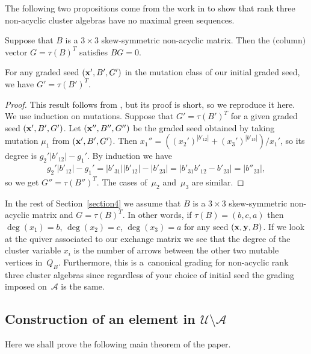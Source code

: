 The following two propositions come from the work in \cite{S1} to show that rank three non-acyclic cluster algebras have no maximal green sequences.
\begin{Theorem}
Suppose that $B$ is a $3\times 3$ skew-symmetric non-acyclic matrix. Then the $($column$)$ vector $G=\tau(B)^T$ satisfies $BG=0.$
\end{Theorem}

\begin{Lemma}\label{lemma: grading}
For any graded seed $({\bf x}',B',G')$ in the mutation class of our initial graded seed, we have $G'= \tau(B')^T$.
\end{Lemma}

\begin{proof}
This result follows from \cite[Lemma~2.3]{S1}, but its proof is short, so we reproduce it here. We use induction on mutations. Suppose that $G'= \tau(B')^T$ for a given graded seed $({\bf x}',B',G')$. Let $({\bf x}'',B'',G'')$ be the graded seed obtained by taking mutation $\mu_1$ from $({\bf x}',B',G')$.  Then $x_1''=((x_2')^{|b'_{12}|}+(x_3')^{|b'_{13}|})/x_1'$, so its degree is $g_2' |b'_{12}|-g_1'$. By induction we have
\begin{gather*}
g_2' |b'_{12}|-g_1' =|b'_{31}| |b'_{12}|-|b'_{23}| = |b'_{31}b'_{12}-b'_{23}| =|b''_{23}|,
\end{gather*}
so we get $G''= \tau(B'')^T$. The cases of~$\mu_2$ and~$\mu_3$ are similar.
\end{proof}


In the rest of Section~\ref{section4} we assume that $B$ is a $3\times 3$ skew-symmetric non-acyclic matrix and $G=\tau(B)^T$. In other words, if $\tau(B)=(b,c,a)$ then $\deg(x_1)=b$, $\deg(x_2)=c$, $\deg(x_3)=a$ for any seed $({\bf x}, {\bf y}, B)$. If we look at the quiver associated to our exchange matrix we see that the degree of the cluster variable $x_i$ is the number of arrows between the other two mutable vertices in~$Q_B$. Furthermore, this is a~canonical grading for non-acyclic rank three cluster algebras since regardless of your choice of initial seed the grading imposed on~$\mathcal{A}$ is the same.

\subsection[Construction of an element in $\mathcal{U}\setminus\mathcal{A}$]{Construction of an element in $\boldsymbol{\mathcal{U}\setminus\mathcal{A}}$}\label{section4.3}
Here we shall prove the following main theorem of the paper.

